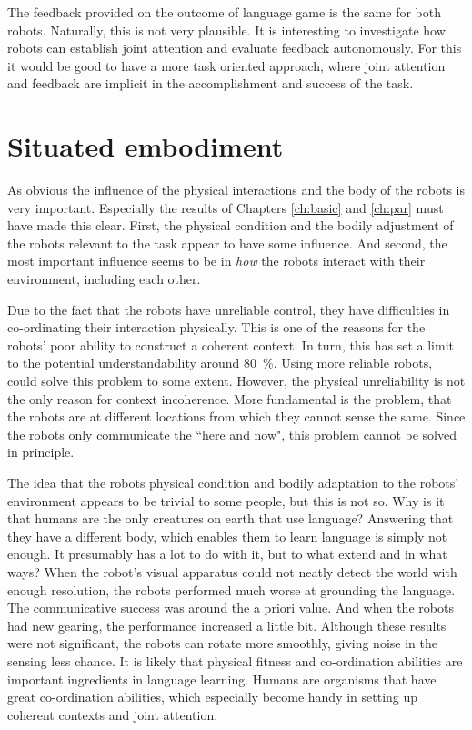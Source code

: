 The feedback provided on the outcome of language game is the same for both robots. Naturally, this is not very plausible. It is interesting to investigate how robots can establish joint attention and evaluate feedback autonomously. For this it would be good to have a more task oriented approach, where joint attention and feedback are implicit in the accomplishment and success of the task.

\section{Situated embodiment}\label{s:disc:phys}

As obvious the influence of the physical interactions and the body of the robots is very important. Especially the results of Chapters \ref{ch:basic} and \ref{ch:par} must have made this clear. First, the physical condition and the bodily adjustment of the robots relevant to the task appear to have some influence. And second, the most important influence seems to be in {\em how} the robots interact with their environment, including each other.

Due to the fact that the robots have unreliable control, they have difficulties in co-ordinating their interaction physically. This is one of the reasons for the robots' poor ability to construct a coherent context. In turn, this has set a limit to the potential understandability around 80~\%. Using more reliable robots, could solve this problem to some extent. However, the physical unreliability is not the only reason for context incoherence. More fundamental is the problem, that the robots are at different locations from which they cannot sense the same. Since the robots only communicate the ``here and now", this problem cannot be solved in principle.

The idea that the robots physical condition and bodily adaptation to the robots' environment appears to be trivial to some people, but this is not so. Why is it that humans are the only creatures on earth that use language? Answering that they have a different body, which enables them to learn language is simply not enough. It presumably has a lot to do with it, but to what extend and in what ways? When the robot's visual apparatus could not neatly detect the world with enough resolution, the robots performed much worse at grounding the language. The communicative success was around the a priori value. And when the robots had new gearing, the performance increased a little bit. Although these results were not significant, the robots can rotate more smoothly, giving noise in the sensing less chance. It is likely that physical fitness and co-ordination abilities are important ingredients in language learning. Humans are organisms that have great co-ordination abilities, which especially become handy in setting up coherent contexts and joint attention.

